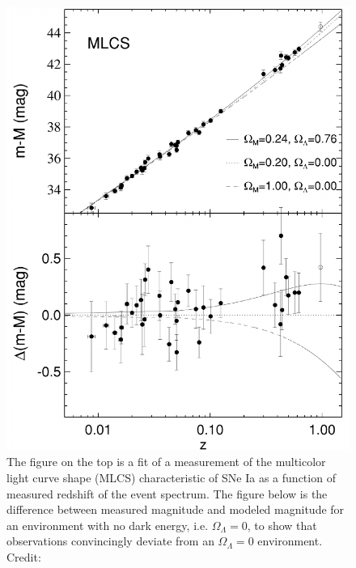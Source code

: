 \documentclass{paper}
\begin{document}
  \begin{figure}[H]
    \begin{centering}
    \includegraphics[scale=0.5]{DE-sn_lightcurve.pdf}
    \caption{The figure on the top is a fit of a measurement of the multicolor 
      light curve shape (MLCS) characteristic of SNe Ia as a function of 
      measured redshift of the event spectrum. The figure below is the
      difference between measured magnitude and modeled magnitude for an 
      environment with no dark energy, i.e. \(\Omega_{\Lambda} = 0\), to show
      that observations convincingly deviate from an \(\Omega_{\Lambda} = 0\) 
      environment.
      Credit: \cite{Riess_1998}}
    \label{fig:DE-sn_lightcurve}
    \end{centering}
  \end{figure}


\end{document}
